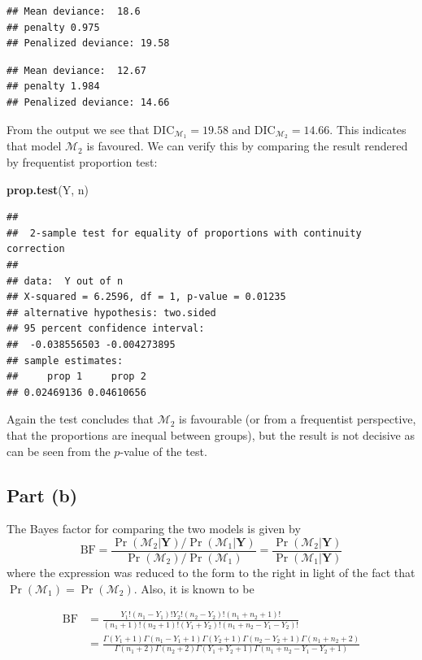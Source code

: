 \documentclass[
]{homework}
\newenvironment{Shaded}{\begin{snugshade}}{\end{snugshade}}
\newcommand{\FunctionTok}[1]{\textcolor[rgb]{0.13,0.29,0.53}{\textbf{#1}}}
\newcommand{\NormalTok}[1]{#1}
\begin{document}
\begin{verbatim}
## Mean deviance:  18.6 
## penalty 0.975 
## Penalized deviance: 19.58
\end{verbatim}

\begin{verbatim}
## Mean deviance:  12.67 
## penalty 1.984 
## Penalized deviance: 14.66
\end{verbatim}

From the output we see that \(\mathrm{DIC}_{\mathcal M_1} = 19.58\) and \(\mathrm{DIC}_{\mathcal M_2} = 14.66\). This indicates that model \(\mathcal M_2\) is favoured.
We can verify this by comparing the result rendered by frequentist proportion test:

\begin{Shaded}
\begin{Highlighting}[]
\FunctionTok{prop.test}\NormalTok{(Y, n)}
\end{Highlighting}
\end{Shaded}

\begin{verbatim}
## 
##  2-sample test for equality of proportions with continuity correction
## 
## data:  Y out of n
## X-squared = 6.2596, df = 1, p-value = 0.01235
## alternative hypothesis: two.sided
## 95 percent confidence interval:
##  -0.038556503 -0.004273895
## sample estimates:
##     prop 1     prop 2 
## 0.02469136 0.04610656
\end{verbatim}

Again the test concludes that \(\mathcal M_2\) is favourable (or from a frequentist perspective, that the proportions are inequal between groups), but the result is not decisive as
can be seen from the \(p\)-value of the test.

\subsection{Part (b)}\label{part-b-2}

The Bayes factor for comparing the two models is given by
\[
  \mathrm{BF} = \frac{\Pr(\mathcal M_2 | \mathbf Y) / \Pr(\mathcal M_1 | \mathbf Y)}{\Pr(\mathcal M_2) / \Pr(\mathcal M_1)} = \frac{\Pr(\mathcal M_2 | \mathbf Y)}{\Pr(\mathcal M_1 | \mathbf Y)}
\]
where the expression was reduced to the form to the right in light of the fact that \(\Pr(\mathcal M_1) = \Pr(\mathcal M_2)\). Also, it is known to be

\begin{align*}
    \mathrm{BF} &= \frac{Y_1!(n_1 - Y_1)! Y_2!(n_2 - Y_2)! (n_1 + n_2 + 1)!}{(n_1 + 1)! (n_2 + 1)! (Y_1 + Y_2)! (n_1 + n_2 - Y_1 - Y_2)!} \\
                &= \frac{\Gamma(Y_1 + 1) \Gamma(n_1 - Y_1 + 1) \Gamma(Y_2 + 1) \Gamma(n_2 - Y_2 + 1) \Gamma(n_1 + n_2 + 2)}{\Gamma(n_1 + 2) \Gamma(n_2 + 2) \Gamma(Y_1 + Y_2 + 1) \Gamma(n_1 + n_2 - Y_1 - Y_2 + 1)}
\end{align*}
\end{document}
